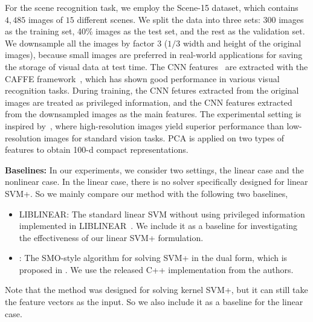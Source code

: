 For the scene recognition task, we employ the Scene-15
dataset\cite{scene-15}, which contains $4,485$ images of $15$
different scenes.  We split the data into three sets: $300$ images as
the training set, 40\% images as the test set, and the rest as the
validation set.  We downsample all the images by factor $3$ ($1/3$
width and height of the original images), because small images are
preferred in real-world applications for saving the storage of visual
data at test time.  The CNN features~\cite{deepnet:nips12} are
extracted with the CAFFE framework~\cite{caffe}, which has shown good
performance in various visual recognition tasks. During training, the
CNN fetures extracted from the original images are treated as
privileged information, and the CNN features extracted from the
downsampled images as the main features. The experimental setting is
inspired by~\cite{SR4VTs:wacv16}, where high-resolution images yield
superior performance than low-resolution images for standard vision
tasks. PCA is applied on two types of features to obtain 100-d
compact representations.

\noindent\textbf{Baselines:}
In our experiments, we consider two settings, the linear case and the
nonlinear case. In the linear case, there is no solver specifically
designed for linear SVM+. So we mainly compare our method with the
following two baselines,
\begin{itemize}
\setlength\itemsep{-2pt}
\item LIBLINEAR: The standard linear SVM without using privileged information implemented in LIBLINEAR~\cite{liblinear}. We include it as a baseline for investigating the effectiveness of our linear SVM+ formulation.
\item \casmo: The SMO-style algorithm for solving SVM+ in the dual form, which is proposed in \cite{Pechyony2010}. We use the released C++ implementation from the authors.
\end{itemize}
Note that the \casmo method was designed for solving kernel SVM+, but
it can still take the feature vectors as the input. So we also include
it as a baseline for the linear case.

